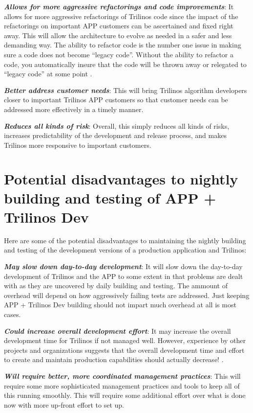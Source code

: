 \documentclass[pdf,ps2pdf,11pt]{SANDreport}
\begin{document}
{}\textit{\textbf{Allows for more aggressive refactorings and code improvements}}:
It allows for more aggressive refactorings of Trilinos code since the impact
of the refactorings on important APP customers can be ascertained and fixed
right away.  This will allow the architecture to evolve as needed in a safer
and less demanding way.  The ability to refactor code is the number one issue
in making sure a code does not become ``legacy code''.  Without the ability to
refactor a code, you automatically insure that the code will be thrown away or
relegated to ``legacy code'' at some point {}\cite{book:code-complete-2}.

{}\textit{\textbf{Better address customer needs}}: This will bring Trilinos
algorithm developers closer to important Trilinos APP customers so that
customer needs can be addressed more effectively in a timely manner.

{}\textit{\textbf{Reduces all kinds of risk}}: Overall, this simply reduces all
kinds of risks, increases predictability of the development and release
process, and makes Trilinos more responsive to important customers.


%
{}\section{Potential disadvantages to nightly building and testing of APP +
Trilinos Dev}
%

Here are some of the potential disadvantages to maintaining the nightly
building and testing of the development versions of a production application
and Trilinos:

{}\textit{\textbf{May slow down day-to-day development}}: It will slow down
the day-to-day development of Trilinos and the APP to some extent in that
problems are dealt with as they are uncovered by daily building and testing.
The ammount of overhead will depend on how aggressively failing tests are
addressed.  Just keeping APP + Trilinos Dev building should not impart much
overhead at all is most cases.

{}\textit{\textbf{Could increase overall development effort}}: It may increase the
overall development time for Trilinos if not managed well.  However,
experience by other projects and organizations suggests that the overall
development time and effort to create and maintain production capabilities
should actually decrease! {}\cite{book:code-complete-2}.

{}\textit{\textbf{Will require better, more coordinated management practices}}:
This will require some more sophisticated management practices and tools to
keep all of this running smoothly.  This will require some additional effort
over what is done now with more up-front effort to set up.
\end{document}
